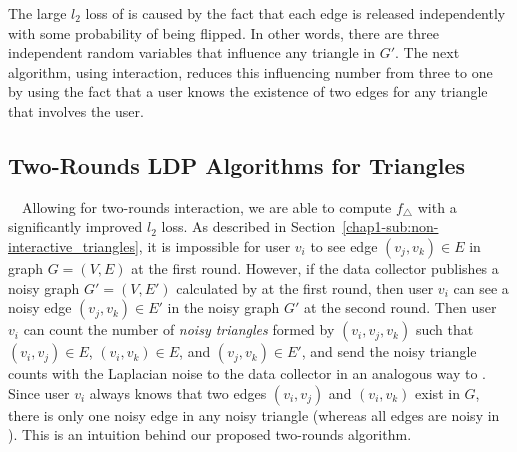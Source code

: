 
The large $l_2$ loss of  is caused by the fact that 
each edge is released independently with
some probability of being flipped. 
In other words, 
there are three independent random
variables that influence 
any triangle in $G'$. 
The next algorithm,
using interaction, 
reduces 
this influencing number 
from three to one 
by using the fact that 
a user 
knows 
the existence of two edges for any triangle that involves the user. 

\subsection{Two-Rounds LDP Algorithms for Triangles}
\label{chap1-sub:two_rounds}

~~Allowing for 
two-rounds interaction, 
we are able to compute $f_{\triangle}$ with
a significantly improved $l_2$ loss. 
As described in Section~\ref{chap1-sub:non-interactive_triangles}, it is impossible for user $v_i$ to see edge $(v_j, v_k) \in E$ in graph $G=(V,E)$ at the first round. 
However, if 
the data collector publishes a noisy graph $G'=(V,E')$ calculated by  at the first round, then 
user $v_i$ can see a noisy edge $(v_j, v_k) \in E'$ in the noisy graph $G'$ at the second round. 
Then user $v_i$ can count the number of \textit{noisy triangles} formed by $(v_i, v_j, v_k)$ such that $(v_i,v_j) \in E$, $(v_i,v_k) \in E$, and $(v_j,v_k) \in E'$, and send the noisy triangle counts with the Laplacian noise to the data collector in an analogous way to . 
Since user $v_i$ always knows that two edges $(v_i,v_j)$ and $(v_i,v_k)$ exist in $G$, 
there is only one noisy edge in any noisy triangle 
(whereas all edges are noisy in ).
This is an intuition behind our proposed two-rounds algorithm. 

